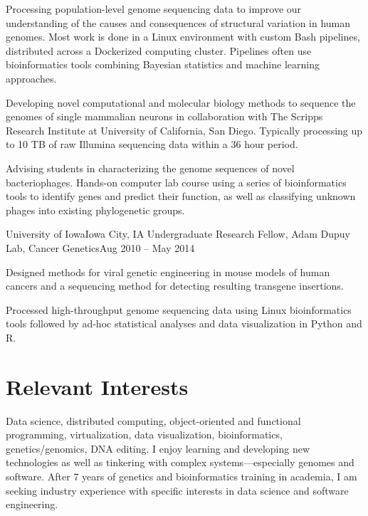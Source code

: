 		\resumeItemListStart

			{Processing population-level genome sequencing data to improve our understanding of the causes and consequences of structural variation in human genomes. Most work is done in a Linux environment with custom Bash pipelines, distributed across a Dockerized computing cluster. Pipelines often use bioinformatics tools combining Bayesian statistics and machine learning approaches.}
			
			{Developing novel computational and molecular biology methods to sequence the genomes of single mammalian neurons in collaboration with The Scripps Research Institute at University of California, San Diego. Typically processing up to 10 TB of raw Illumina sequencing data within a 36 hour period.}
			
			{Advising students in characterizing the genome sequences of novel bacteriophages. Hands-on computer lab course using a series of bioinformatics tools to identify genes and predict their function, as well as classifying unknown phages into existing phylogenetic groups.}

		\resumeItemListEnd

		\resumeSubheading
		{University of Iowa}{Iowa City, IA}
		{Undergraduate Research Fellow, Adam Dupuy Lab, Cancer Genetics}{Aug 2010 -- May 2014}

		\resumeItemListStart

			{Designed methods for viral genetic engineering in mouse models of human cancers and a sequencing method for detecting resulting transgene insertions.}
			
			{Processed high-throughput genome sequencing data using Linux bioinformatics tools followed by ad-hoc statistical analyses and data visualization in Python and R.}

		\resumeItemListEnd

	\resumeSubHeadingListEnd

\section{Relevant Interests}
   \small{Data science, distributed computing, object-oriented and functional programming, virtualization, data visualization, bioinformatics, genetics/genomics, DNA editing. I enjoy learning and developing new technologies as well as tinkering with complex systems---especially genomes and software. After 7 years of genetics and bioinformatics training in academia, I am seeking industry experience with specific interests in data science and software engineering.}

